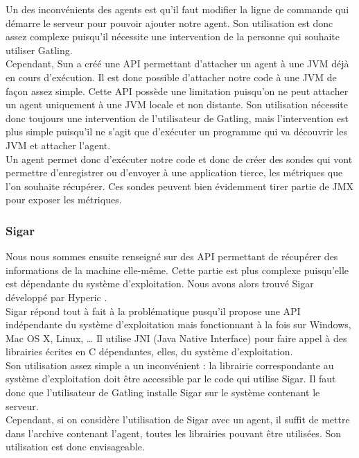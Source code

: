 Un des inconvénients des agents est qu'il faut modifier la ligne de commande qui démarre le serveur pour pouvoir ajouter notre agent. Son utilisation est donc assez complexe puisqu'il nécessite une intervention de la personne qui souhaite utiliser Gatling.\\

Cependant, Sun a créé une API permettant d'attacher un agent à une JVM déjà en cours d'exécution. Il est donc possible d'attacher notre code à une JVM de façon assez simple. Cette API possède une limitation puisqu'on ne peut attacher un agent uniquement à une JVM locale et non distante. Son utilisation nécessite donc toujours une intervention de l'utilisateur de Gatling, mais l'intervention est plus simple puisqu'il ne s'agit que d'exécuter un programme qui va découvrir les JVM et attacher l'agent.\\

Un agent permet donc d'exécuter notre code et donc de créer des sondes qui vont permettre d'enregistrer ou d'envoyer à une application tierce, les métriques que l'on souhaite récupérer. Ces sondes peuvent bien évidemment tirer partie de JMX pour exposer les métriques.

\subsubsection{Sigar}

Nous nous sommes ensuite renseigné sur des API permettant de récupérer des informations de la machine elle-même. Cette partie est plus complexe puisqu'elle est dépendante du système d'exploitation. Nous avons alors trouvé Sigar développé par Hyperic \cite{sigar}.\\

Sigar répond tout à fait à la problématique pusqu'il propose une API indépendante du système d'exploitation mais fonctionnant à la fois sur Windows, Mac OS X, Linux, \dots{} Il utilise JNI (Java Native Interface) pour faire appel à des librairies écrites en C dépendantes, elles, du système d'exploitation.\\

Son utilisation assez simple a un inconvénient : la librairie correspondante au système d'exploitation doit être accessible par le code qui utilise Sigar. Il faut donc que l'utilisateur de Gatling installe Sigar sur le système contenant le serveur.\\

Cependant, si on considère l'utilisation de Sigar avec un agent, il suffit de mettre dans l'archive contenant l'agent, toutes les librairies pouvant être utilisées. Son utilisation est donc envisageable.

